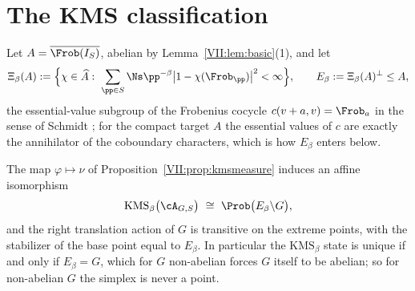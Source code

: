 \section{The KMS classification}

\begin{definition}\label{VII:def:E}
Let $A=\overline{\Frob(I_S)}$, abelian by Lemma~\ref{VII:lem:basic}(1), and let
\[
\Xi_\beta(A):=\Bigl\{\chi\in\widehat A:\ \sum_{\pp\in S}\Ns\pp^{-\beta}\bigl|1-\chi(\Frob_\pp)\bigr|^2<\infty\Bigr\},
\qquad
E_\beta:=\Xi_\beta(A)^\perp\le A ,
\]
the essential-value subgroup of the Frobenius cocycle $c(v+a,v)=\Frob_a$ in the sense of
Schmidt \cite{Schmidt}; for the compact target $A$ the essential values of $c$ are exactly
the annihilator of the coboundary characters, which is how $E_\beta$ enters below.
\end{definition}

\begin{theorem}[Classification]\label{VII:thm:main}
The map $\varphi\mapsto\nu$ of Proposition~\ref{VII:prop:kmsmeasure} induces an affine
isomorphism
\begin{equation}\label{VII:eq:main}
\mathrm{KMS}_\beta\bigl(\cA_{G,S}\bigr)\ \cong\ \Prob\bigl(E_\beta\backslash G\bigr),
\end{equation}
and the right translation action of $G$ is transitive on the extreme points, with the
stabilizer of the base point equal to $E_\beta$. In particular the $\mathrm{KMS}_\beta$
state is unique if and only if $E_\beta=G$, which for $G$ non-abelian forces $G$ itself to be
abelian; so for non-abelian $G$ the simplex is never a point.
\end{theorem}

